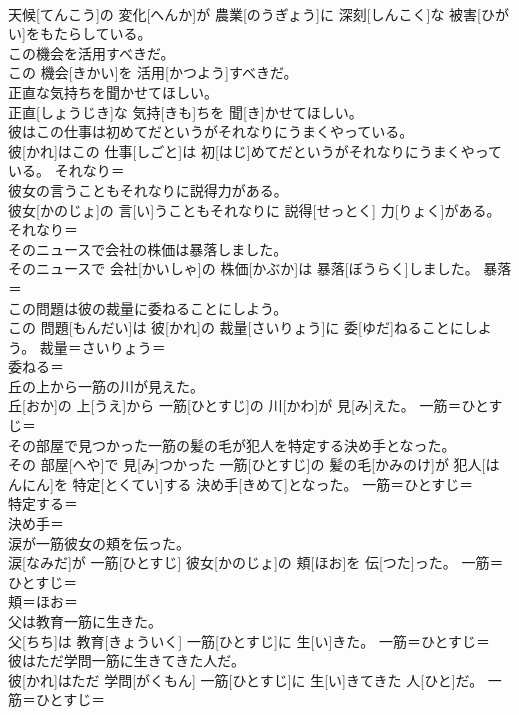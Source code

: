 \documentclass[8pt]{extreport}
\begin{document}
\begin{CJK}{UTF8}{min}
\\	天候[てんこう]の 変化[へんか]が 農業[のうぎょう]に 深刻[しんこく]な 被害[ひがい]をもたらしている。	
\\	この機会を活用すべきだ。	
\\	この 機会[きかい]を 活用[かつよう]すべきだ。	
\\	正直な気持ちを聞かせてほしい。	
\\	正直[しょうじき]な 気持[きも]ちを 聞[き]かせてほしい。	
\\	彼はこの仕事は初めてだというがそれなりにうまくやっている。	
\\	彼[かれ]はこの 仕事[しごと]は 初[はじ]めてだというがそれなりにうまくやっている。	それなり＝ 
\\	彼女の言うこともそれなりに説得力がある。	
\\	彼女[かのじょ]の 言[い]うこともそれなりに 説得[せっとく] 力[りょく]がある。	それなり＝ 
\\	そのニュースで会社の株価は暴落しました。	
\\	そのニュースで 会社[かいしゃ]の 株価[かぶか]は 暴落[ぼうらく]しました。	暴落＝ 
\\	この問題は彼の裁量に委ねることにしよう。	
\\	この 問題[もんだい]は 彼[かれ]の 裁量[さいりょう]に 委[ゆだ]ねることにしよう。	裁量＝さいりょう＝ 
\\	委ねる＝ 
\\	丘の上から一筋の川が見えた。	
\\	丘[おか]の 上[うえ]から 一筋[ひとすじ]の 川[かわ]が 見[み]えた。	一筋＝ひとすじ＝ 
\\	その部屋で見つかった一筋の髪の毛が犯人を特定する決め手となった。	
\\	その 部屋[へや]で 見[み]つかった 一筋[ひとすじ]の 髪の毛[かみのけ]が 犯人[はんにん]を 特定[とくてい]する 決め手[きめて]となった。	一筋＝ひとすじ＝ 
\\	特定する＝ 
\\	決め手＝ 
\\	涙が一筋彼女の頬を伝った。	
\\	涙[なみだ]が 一筋[ひとすじ] 彼女[かのじょ]の 頬[ほお]を 伝[つた]った。	一筋＝ひとすじ＝ 
\\	頬＝ほお＝ 
\\	父は教育一筋に生きた。	
\\	父[ちち]は 教育[きょういく] 一筋[ひとすじ]に 生[い]きた。	一筋＝ひとすじ＝ 
\\	彼はただ学問一筋に生きてきた人だ。	
\\	彼[かれ]はただ 学問[がくもん] 一筋[ひとすじ]に 生[い]きてきた 人[ひと]だ。	一筋＝ひとすじ＝ 

\end{CJK}
\end{document}
